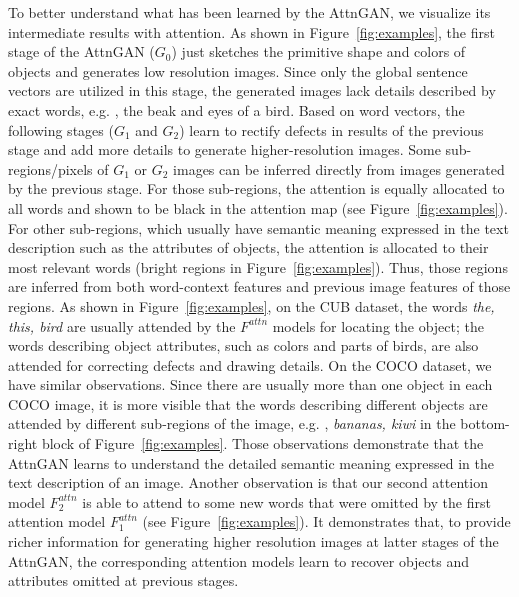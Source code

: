 {To better understand what has been learned by the AttnGAN, we visualize its intermediate results with attention. As shown in Figure~\ref{fig:examples}, the first stage of the AttnGAN ($G_0$) just sketches the primitive shape and colors of objects and generates low resolution images. Since only the global sentence vectors are utilized in this stage, the generated images lack details described by exact words, e.g. , the beak and eyes of a bird. Based on word vectors, the following stages ($G_1$ and $G_2$) learn to rectify defects in results of the previous stage and add more details to generate higher-resolution images. Some sub-regions/pixels of $G_1$ or $G_2$ images can be inferred directly from images generated by the previous stage. For those sub-regions, the attention is equally allocated to all words and shown to be black in the attention map (see Figure~\ref{fig:examples}). For other sub-regions, which usually have semantic meaning expressed in the text description such as the attributes of objects, the attention is allocated to their most relevant words (bright regions in Figure~\ref{fig:examples}). Thus, those regions are inferred from both word-context features and previous image features of those regions.  As shown in Figure~\ref{fig:examples}, on the CUB dataset, the words \textit{the, this, bird} are usually attended by the $F^{attn}$ models for locating the object; the words describing object attributes, such as colors and parts of birds, are also attended for correcting defects and drawing details. On the COCO dataset, we have similar observations. Since there are usually more than one object in each COCO image, it is more visible that the words describing different objects are attended by different sub-regions of the image, e.g. , \textit{bananas, kiwi} in the bottom-right block of Figure~\ref{fig:examples}. Those observations demonstrate that the AttnGAN learns to understand the detailed semantic meaning expressed in the text description of an image. Another observation is that our second attention model $F^{attn}_2$ is able to attend to some new words that were omitted by the first attention model $F^{attn}_1$ (see Figure~\ref{fig:examples}). It demonstrates that, to provide richer information for generating higher resolution images at latter stages of the AttnGAN, the corresponding attention models learn to recover objects and attributes omitted at previous stages. 

}

